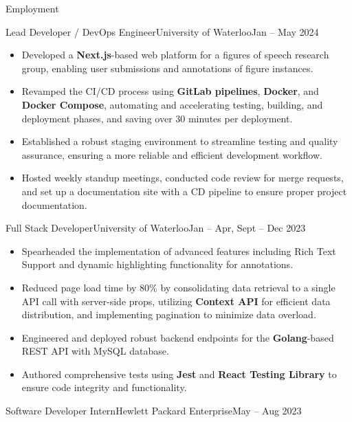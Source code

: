 \documentclass[]{mcdowellcv}
\begin{document}
	\makeheader
	\begin{cvsection}{Employment}
		\begin{cvsubsection}{Lead Developer / DevOps Engineer}{University of Waterloo}{Jan -- May 2024}	
			\begin{itemize}
				\item Developed a \textbf{Next.js}-based web platform for a figures of speech research group, enabling user submissions and annotations of figure instances.
				\item Revamped the CI/CD process using \textbf{GitLab pipelines}, \textbf{Docker}, and \textbf{Docker Compose}, automating and accelerating testing, building, and deployment phases, and saving over 30 minutes per deployment.
				\item Established a robust staging environment to streamline testing and quality assurance, ensuring a more reliable and efficient development workflow.
				\item Hosted weekly standup meetings, conducted code review for merge requests, and set up a documentation site with a CD pipeline to ensure proper project documentation.
			\end{itemize}	
		\end{cvsubsection}
		\begin{cvsubsection}{Full Stack Developer}{University of Waterloo}{Jan -- Apr, Sept -- Dec 2023}
			\begin{itemize}
				\item Spearheaded the implementation of advanced features including Rich Text Support and dynamic highlighting functionality for annotations.
				\item Reduced page load time by 80\% by consolidating data retrieval to a single API call with server-side props, utilizing \textbf{Context API} for efficient data distribution, and implementing pagination to minimize data overload.
				\item Engineered and deployed robust backend endpoints for the \textbf{Golang}-based REST API with MySQL database.
				\item Authored comprehensive tests using \textbf{Jest} and \textbf{React Testing Library} to ensure code integrity and functionality.
			\end{itemize}
		\end{cvsubsection}
		\begin{cvsubsection}{Software Developer Intern}{Hewlett Packard Enterprise}{May -- Aug 2023}	
			\begin{itemize}

\end{itemize}
\end{cvsubsection}
\end{cvsection}
\end{document}
